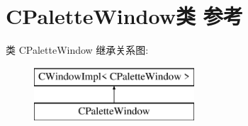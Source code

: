 \hypertarget{class_c_palette_window}{}\section{C\+Palette\+Window类 参考}
\label{class_c_palette_window}
类 C\+Palette\+Window 继承关系图\+:\begin{figure}[H]
\begin{center}
\leavevmode
\includegraphics[height=2.000000cm]{class_c_palette_window}
\end{center}
\end{figure}
